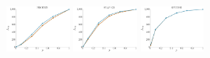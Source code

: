 \documentclass[a4paper]{report}
\newcommand{\wratio}{0.16}
\begin{document}
\includegraphics[width=\wratio\textwidth]{influence/PROTEIN/fs_protein}\hfill
\includegraphics[width=\wratio\textwidth]{influence/SNAP_GR/fs_snap_gr}\hfill
\includegraphics[width=\wratio\textwidth]{influence/SPANISH/fs_spanish}\hfill
\end{document}
